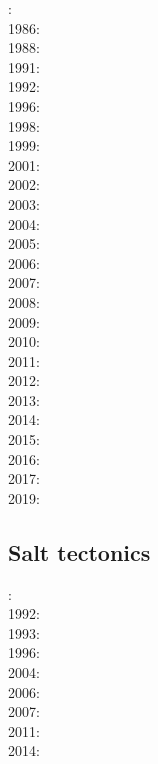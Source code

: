 : \cite{bosw85}\\
1986: \cite{hoen86b}\cite{zupf86}\cite{zupa86}\cite{mofr86}\\
1988: \cite{bums88}\\
1991: \cite{trbr91}\cite{buck91}\\
1992: \cite{zieg92b}\\
1996: \cite{dusa96}\cite{beda96}\\
1998: \cite{rafm98}\\
1999: \cite{brun99}\cite{bulp99}\\
2001: \cite{hupc01}\\
2002: \cite{hube02}\cite{hani02}\cite{dabm02}\\
2003: \cite{hube03}\cite{hani03}\cite{covb03}\\
2004: \cite{hier04}\\
2005: \cite{hubb05}\cite{coub05}\\
2006: \cite{tibs06}\cite{coma06}\\
2007: \cite{huha07}\cite{macl07}\\
2008: \cite{cort08}\\
2009: \cite{agcz09}\cite{kekj09}\\
2010: \cite{aubh10}\\
2011: \cite{alht11}\\
2012: \cite{alht12}\cite{brps12}\\
2013: \cite{alhf13}\cite{brau13}\cite{chbe13}\cite{knak13}\cite{kern13}\cite{mipf13}\\
2014: \cite{hebr14}\cite{lige14}\cite{brun14}\cite{kobf14}\\
2015: \cite{nabu15}\\
2016: \cite{olbm16}\cite{jekm16}\cite{zwsn16}\\
2017: \cite{lemh17}\\
2019: \cite{lisp19}\cite{zwsb19}\cite{anpa19}

\subsection*{Salt tectonics}

: \cite{tars91}\\
1992: \cite{zaju92}\\
1993: \cite{nabr93}\\
1996: \cite{maar96}\\
2004: \cite{istt04}\\
2006: \cite{maqs07}\\
2007: \cite{huja07}\\
2011: \cite{brfo11}\\
2014: \cite{bakp14}

